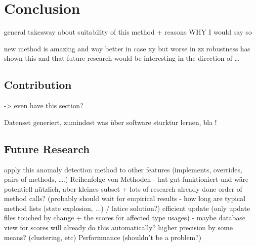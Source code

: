 \chapter{Conclusion}
general takeaway about suitability of this method + reasons WHY I would say so

new method is amazing and way better in case xy but worse in zz
robustness has shown this and that
future research would be interesting in the direction of \ldots

\section{Contribution}
-> even have this section?

Datenset generiert, zumindest was über software sturktur lernen, bla !

\section{Future Research}
apply this anomaly detection method to other features (implements, overrides, pairs of methods, \ldots.)
Reihenfolge von Methoden - hat gut funktioniert und wäre potentiell nützlich, aber kleines subset + lots of research already done
order of method calls? (probably should wait for empirical results - how long are typical method lists (state explosion, ...) / latice solution?)
efficient update (only update files touched by change + the scores for affected type usages) - maybe database view for scores will already do this automatically? 
higher precision by some means? (clustering, etc)
Performnance (shouldn't be a problem?)

